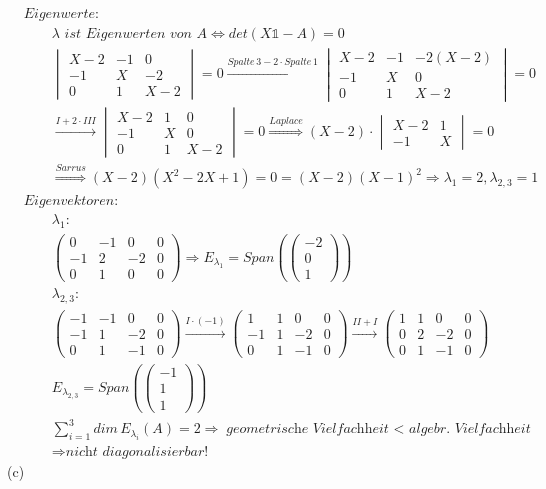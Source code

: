 \documentclass[titlepage]{article}
\newcommand{\1}{\mathbb{1}}
\newcommand{\0}{\mathbb{0}}
\newcommand{\vecD}[3]{\left(\begin{smallmatrix}#1\\#2\\#3\end{smallmatrix}\right)}
\newcommand{\detZ}[4]{\begin{vmatrix}#1&#2\\#3&#4\end{vmatrix}}
\newcommand{\detD}[9]{\begin{vmatrix}#1&#2&#3\\#4&#5&#6\\#7&#8&#9\end{vmatrix}}
\begin{document}
			\begin{align*}
				&\textit{Eigenwerte: }\\
				&\quad\quad\lambda\textit{ ist Eigenwerten von }A\Leftrightarrow det(X\1-A)=0\\
				&\quad\quad\detD{X-2}{-1}{0}{-1}{X}{-2}{0}{1}{X-2}=0\xrightarrow{Spalte\,3-2\cdot Spalte\,1}\detD{X-2}{-1}{-2(X-2)}{-1}{X}{0}{0}{1}{X-2}=0\\
				&\quad\quad\xrightarrow{I+2\cdot III}\detD{X-2}{1}{0}{-1}{X}{0}{0}{1}{X-2}=0\overset{Laplace}{\Rightarrow}(X-2)\cdot\detZ{X-2}{1}{-1}{X}=0\\
				&\quad\quad\overset{Sarrus}{\Rightarrow}(X-2)(X^2-2X+1)=0=(X-2)(X-1)^2\Rightarrow\lambda_1=2,\lambda_{2,3}=1\\
				&\textit{Eigenvektoren: }\\
				&\quad\quad\lambda_1:\\
				&\quad\quad
				\left(\begin{array}{ccc|c}
					0&-1&0&0\\-1&2&-2&0\\0&1&0&0
				\end{array}\right)\Rightarrow E_{\lambda_1}=Span(\vecD{-2}{0}{1})\\
				&\quad\quad\lambda_{2,3}:\\
				&\quad\quad
				\left(\begin{array}{ccc|c}
					-1&-1&0&0\\-1&1&-2&0\\0&1&-1&0
				\end{array}\right)\xrightarrow{I\cdot(-1)}
				\left(\begin{array}{ccc|c}
					1&1&0&0\\-1&1&-2&0\\0&1&-1&0
				\end{array}\right)\xrightarrow{II+I}
				\left(\begin{array}{ccc|c}
					1&1&0&0\\0&2&-2&0\\0&1&-1&0
				\end{array}\right)\\
				&\quad\quad E_{\lambda_{2,3}}=Span(\vecD{-1}{1}{1})\\
				&\quad\quad\sum_{i=1}^{3}dim\,E_{\lambda_i}(A)=2\Rightarrow\textit{geometrische Vielfachheit $<$ algebr. Vielfachheit}\\
				&\quad\quad\Rightarrow\textit{nicht diagonalisierbar!}
			\end{align*}
		(c)
\end{document}
